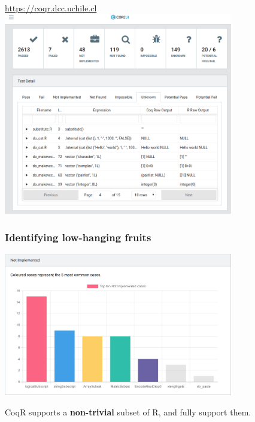 \documentclass{beamer}
\newcommand\emphb{\textbf}
\begin{document}
\begin{frame}
    \begin{center}
        \vspace{-2mm}
        \href{https://coqr.dcc.uchile.cl/\#/test-detail/148}{\url{https://coqr.dcc.uchile.cl}}
        \vspace{2mm}
        \includegraphics[width=10cm]{images/unknown.png}
    \end{center}
\end{frame}




\begin{frame}
    \frametitle{Identifying low-hanging fruits}

    \begin{center}
        \includegraphics[width=10cm]{images/not-implemented.png}
    \end{center}

    \pause
    CoqR supports a \emphb{non-trivial} subset of R, and fully support them.

\end{frame}
\end{document}
